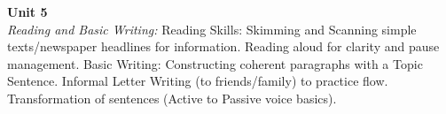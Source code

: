 \vspace{0.3cm}

\noindent\textbf{Unit 5} \\
\textit{Reading and Basic Writing:} Reading Skills: Skimming and Scanning simple texts/newspaper headlines for information. Reading aloud for clarity and pause management. Basic Writing: Constructing coherent paragraphs with a Topic Sentence. Informal Letter Writing (to friends/family) to practice flow. Transformation of sentences (Active to Passive voice basics).

\newpage
{}